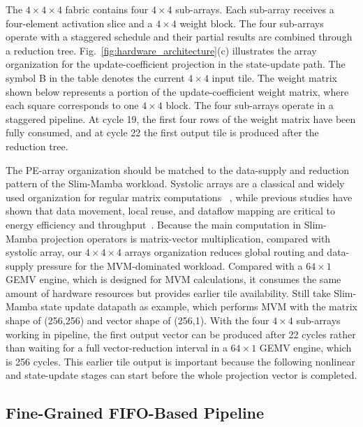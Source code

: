 \documentclass[lettersize,journal]{IEEEtran}
\begin{document}
The $4\times4\times4$ fabric contains four $4\times4$ sub-arrays. Each
sub-array receives a four-element activation slice and a $4\times4$ weight
block. The four sub-arrays operate with a staggered schedule and their partial
results are combined through a reduction tree. Fig.~\ref{fig:hardware_architecture}(c)
illustrates the array organization for the update-coefficient projection in the
state-update path. The symbol B in the table denotes the current $4\times4$
input tile. The weight matrix shown below represents a portion of the
update-coefficient weight matrix, where each square corresponds to one
$4\times4$ block. The four sub-arrays operate in a staggered pipeline. At cycle
19, the first four rows of the weight matrix have been fully consumed, and at
cycle 22 the first output tile is produced after the reduction tree.
 
The PE-array organization should be matched to the data-supply and reduction pattern of the 
Slim-Mamba workload. Systolic arrays are a classical and widely used organization for regular 
matrix computations ~\cite{Kung1982Systolic,Liu2020STA}, while previous studies
have shown that data movement, local reuse, and dataflow mapping are critical to energy efficiency 
and throughput~\cite{Sze2017EfficientDNN,Chen2017Eyeriss}. Because the main computation in Slim-Mamba projection 
operators is matrix-vector multiplication, compared with systolic 
array, our $4\times4\times4$ arrays organization reduces global routing and
data-supply pressure for the MVM-dominated workload. Compared with a
$64\times1$ GEMV engine, which is designed for MVM calculations, it consumes the same amount of hardware resources but provides
earlier tile availability. Still take Slim-Mamba state update datapath as example, which
performs MVM with the matrix shape of (256,256) and vector shape of (256,1). With the 
four $4\times4$ sub-arrays working in pipeline, the first output vector can be produced 
after 22 cycles rather than waiting for a full
vector-reduction interval in a $64\times1$ GEMV engine, which is 256 cycles. 
This earlier tile output is important because the
following nonlinear and state-update stages can start before the whole
projection vector is completed.

\subsection{Fine-Grained FIFO-Based Pipeline}
\end{document}
